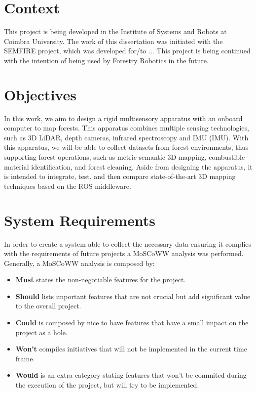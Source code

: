 \section{Context}

This project is being developed in the Institute of Systems and Robots at Coimbra University. The work of this dissertation was initiated with the SEMFIRE project, which was developed for/to ... This project is being continued with the intention of being used by Forestry Robotics in the future.

\section{Objectives}
In this work, we aim to design a rigid multisensory apparatus with an onboard computer to map forests. This apparatus combines multiple sensing technologies, such as 3D \acs{LiDAR}, depth cameras, infrared spectroscopy and \acl{IMU} (\acs{IMU}). With this apparatus, we will be able to collect datasets from forest environments, thus supporting forest operations, such as metric-semantic 3D mapping, combustible material identification, and forest cleaning. Aside from designing the apparatus, it is intended to integrate, test, and then compare state-of-the-art 3D mapping techniques based on the ROS middleware.

\section{System Requirements}

In order to create a system able to collect the necessary data ensuring it complies with the requirements of future projects a MoSCoWW analysis was performed. Generally, a MoSCoWW analysis is composed by:

\begin{itemize}
    \item \textbf{Must} states the non-negotiable features for the project.
    \item \textbf{Should} lists important features that are not crucial but add significant value to the overall project.
    \item \textbf{Could} is composed by nice to have features that have a small impact on the project as a hole.
    \item \textbf{Won't} compiles initiatives that will not be implemented in the current time frame.
    \item \textbf{Would} is an extra category stating features that won't be commited during the execution of the project, but will try to be implemented.
\end{itemize}


